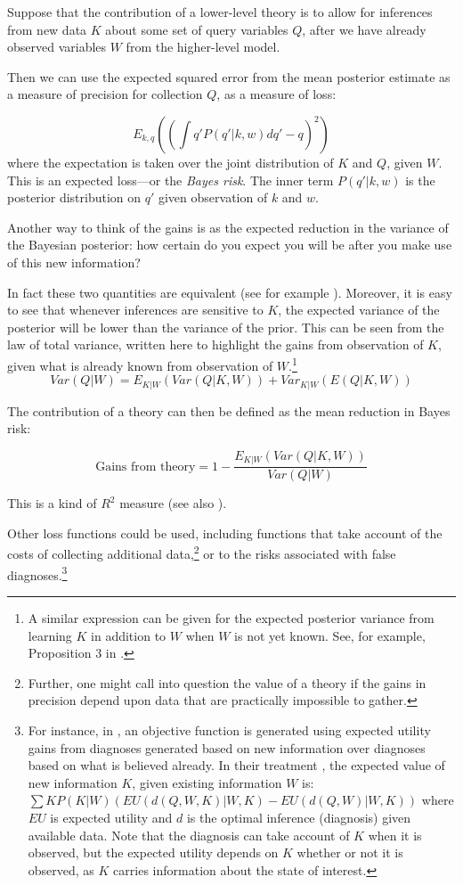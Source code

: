 \documentclass[12pt,]{book}
\let\rmarkdownfootnote\footnote%
\def\footnote{\protect\rmarkdownfootnote}
\begin{document}
Suppose that the contribution of a lower-level theory is to allow for inferences from new data \(K\) about some set of query variables \(Q\), after we have already observed variables \(W\) from the higher-level model.

Then we can use the expected squared error from the mean posterior estimate as a measure of precision for collection \(Q\), as a measure of loss:

\[E_{k, q} \left(\left( \int q' P(q' | k, w)dq' - q\right)^2\right)\]
where the expectation is taken over the joint distribution of \(K\) and \(Q\), given \(W\). This is an expected loss---or the \emph{Bayes risk}. The inner term \(P(q'|k, w)\) is the posterior distribution on \(q'\) given observation of \(k\) and \(w\).

Another way to think of the gains is as the expected reduction in the variance of the Bayesian posterior: how certain do you expect you will be after you make use of this new information?

In fact these two quantities are equivalent (see for example \citet{scharf1991statistical}). Moreover, it is easy to see that whenever inferences are sensitive to \(K\), the expected variance of the posterior will be lower than the variance of the prior. This can be seen from the law of total variance, written here to highlight the gains from observation of \(K\), given what is already known from observation of \(W\).\footnote{A similar expression can be given for the expected posterior variance from learning \(K\) in addition to \(W\) when \(W\) is not yet known. See, for example, Proposition 3 in \citet{geweke2014analysis}.}\\
\[Var(Q|W) = E_{K|W}(Var(Q|K,W)) +Var_{K|W}(E(Q|K,W))\]

The contribution of a theory can then be defined as the mean reduction in Bayes risk:

\[\text{Gains from theory} = 1- \frac{E_{K|W}(Var(Q|K,W))}{Var(Q|W)}\]

This is a kind of \(R^2\) measure (see also \citet{gelman2006bayesian}).

Other loss functions could be used, including functions that take account of the costs of collecting additional data,\footnote{Further, one might call into question the value of a theory if the gains in precision depend upon data that are practically impossible to gather.} or to the risks associated with false diagnoses.\footnote{For instance, in \citet{heckerman1991toward}, an objective function is generated using expected utility gains from diagnoses generated based on new information over diagnoses based on what is believed already. In their treatment \citep[Equation 6]{heckerman1991toward}, the expected value of new information \(K\), given existing information \(W\) is: \(\sum{K}P(K|W)( EU(d(Q,W,K)|W, K) - EU(d(Q, W)|W, K))\) where \(EU\) is expected utility and \(d\) is the optimal inference (diagnosis) given available data. Note that the diagnosis can take account of \(K\) when it is observed, but the expected utility depends on \(K\) whether or not it is observed, as \(K\) carries information about the state of interest.}
\end{document}

